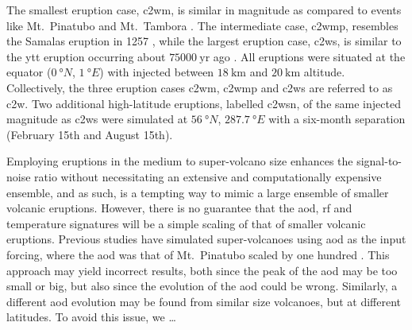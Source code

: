 \documentclass{ametsocV6.1}
\newcommand{\iso}[1][i]{{#1}njected \ce{SO2}}
\begin{document}
The smallest eruption case, \gls{c2wm}, is similar in magnitude as compared to events
like Mt.\ Pinatubo
\citep[\(\sim10\)--\(\SI{20}{\tera\gram(\ce{SO2})}\);][]{timmreck2018} and Mt.\ Tambora
\citep[\(\sim\SI{56.2}{\tera\gram(\ce{SO2})}\);][]{zanchettin2016}. The intermediate
case, \gls{c2wmp}, resembles the Samalas eruption in 1257
\citep[\(\sim{118.8}\)--\(\SI{173.1}{\tera\gram(\ce{SO2})}\);][]{toohey2017,ottobliesner2016},
while the largest eruption case, \gls{c2ws}, is similar to the \gls{ytt} eruption
occurring about \(\SI{75000}{\mathrm{yr}}\) ago
\citep[\(100\)--\(\SI{10000}{\tera\gram(\ce{SO2})}\);][]{jones2005}. All eruptions were
situated at the equator (\(\SI{0}{\degree N}\), \(\SI{1}{\degree E}\)) with 
injected between \(\SI{18}{\kilo\meter}\) and \(\SI{20}{\kilo\meter}\) altitude.
Collectively, the three eruption cases \gls{c2wm}, \gls{c2wmp} and \gls{c2ws} are
referred to as \gls{c2w}. Two additional high-latitude eruptions, labelled \gls{c2wsn},
of the same \iso{} magnitude as \gls{c2ws} were simulated at \(\SI{56}{\degree N}\),
\(\SI{287.7}{\degree E}\) with a six-month separation (February 15th and August 15th).

Employing eruptions in the medium to super-volcano size enhances the signal-to-noise
ratio without necessitating an extensive and computationally expensive ensemble, and as
such, is a tempting way to mimic a large ensemble of smaller volcanic eruptions.
However, there is no guarantee that the \gls{aod}, \gls{rf} and temperature signatures
will be a simple scaling of that of smaller volcanic eruptions. Previous studies have
simulated super-volcanoes using \gls{aod} as the input forcing, where the \gls{aod} was
that of Mt.\ Pinatubo scaled by one hundred \citep{jones2005}. This approach may yield
incorrect results, both since the peak of the \gls{aod} may be too small or big, but
also since the evolution of the \gls{aod} could be wrong. Similarly, a different
\gls{aod} evolution may be found from similar size volcanoes, but at different
latitudes. To avoid this issue, we \dots
\end{document}
